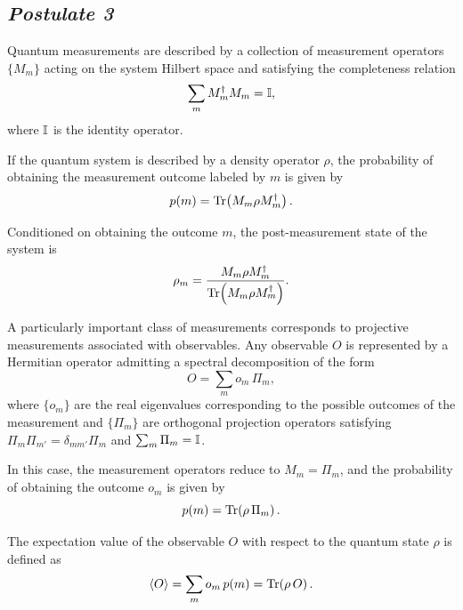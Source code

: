 \subsection*{\small\textit{Postulate 3}}

Quantum measurements are described by a collection of measurement operators $\{ M_m \}$ acting on the system Hilbert space and satisfying the completeness relation
\begin{equation}
    \sum_m M_m^{\dagger} M_m = \mathbb{I},
\end{equation}
where $\mathbb{I}$ is the identity operator.

If the quantum system is described by a density operator $\rho$, the probability of obtaining the measurement outcome labeled by $m$ is given by
\begin{equation}
    p(m) = \Tr\!\left( M_m \rho M_m^{\dagger} \right).
\end{equation}

Conditioned on obtaining the outcome $m$, the post-measurement state of the system is
\begin{equation}
    \rho_m =
    \frac{ M_m \rho M_m^{\dagger} }
    { \Tr\!\left( M_m \rho M_m^{\dagger} \right) }.
\end{equation}

\medskip

A particularly important class of measurements corresponds to projective measurements associated with observables. Any observable $O$ is represented by a Hermitian operator admitting a spectral decomposition of the form
\begin{equation}
    O = \sum_m o_m \, \Pi_m,
\end{equation}
where $\{o_m\}$ are the real eigenvalues corresponding to the possible outcomes of the measurement and $\{\Pi_m\}$ are orthogonal projection operators satisfying $\Pi_m \Pi_{m'} = \delta_{m m'} \Pi_m$ and $\sum_m \Pi_m = \mathbb{I}$.

In this case, the measurement operators reduce to $M_m = \Pi_m$, and the probability of obtaining the outcome $o_m$ is given by
\begin{equation}
    p(m) = \Tr\!\left( \rho \, \Pi_m \right).
\end{equation}

The expectation value of the observable $O$ with respect to the quantum state $\rho$ is defined as
\begin{equation}
    \langle O \rangle = \sum_m o_m \, p(m)
    = \Tr\!\left( \rho \, O \right).
\end{equation}

